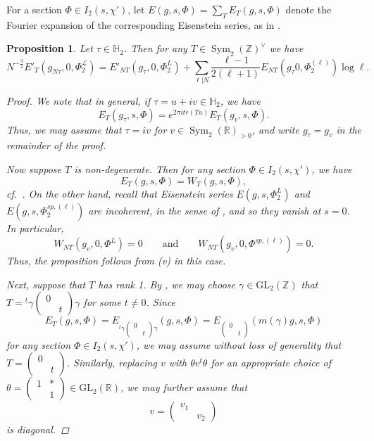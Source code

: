 \documentclass[reqno,oneside]{amsart}
\theoremstyle{plain}
\newtheorem{proposition}[theorem]{Proposition}
\theoremstyle{remark}
\numberwithin{theorem}{section}
\newcommand{\bbR}{\mathbb R}
\newcommand{\bbZ}{\mathbb Z}
\newcommand{\calL}{\mathcal L}
\newcommand{\psm}[1]{\left( \begin{smallmatrix}#1 \end{smallmatrix} \right)}
\DeclareMathOperator{\Sym}{Sym}
\newcommand{\GL}{\mathrm{GL}}
\begin{document}
	For a section $\Phi \in I_{2}(s, \chi')$, let  $E(g, s, \Phi) = \sum_{T} E_T(g, s, \Phi)$ denote the Fourier expansion of the corresponding Eisenstein series, as in .
	
	\begin{proposition} \label{prop5.3}
		Let $\tau \in \mathbb H_2$. Then for any $T \in \Sym_{2}(\bbZ)^{\vee}$ we have
		\begin{equation}
		N^{- \frac32}E'_T(g_{N\tau}, 0, \Phi^{\calL}_2) = E'_{NT}(g_{\tau}, 0, \Phi^{L}_2) + \sum_{\ell|N} \frac{\ell-1}{2(\ell+1)} E_{NT}(g_\tau 0, \Phi^{(\ell)}_2) \log \ell.
		\end{equation}
	
		\begin{proof}
			
			We note that in general, if $\tau = u+iv\in \mathbb H_2$, we have
				\begin{equation}
					E_{T}(g_{\tau},s, \Phi) = e^{2 \pi i tr(Tu)} E_T(g_v, s, \Phi).
				\end{equation}
			Thus, we may assume that $\tau = iv$ for $v \in \Sym_2(\bbR)_{>0}$, and write $g_{\tau} = g_v$ in the remainder of the proof.
			
			
			Now suppose $T$ is non-degenerate. Then for any section $\Phi \in I_2(s, \chi')$, we have
			\begin{equation}
			E_T(g, s, \Phi) = W_T(g, s, \Phi),
			\end{equation}
			cf.\ . On the other hand, recall that Eisenstein series $E(g, s, \Phi^L_2)$ and $E(g, s, \Phi^{sp, (\ell)}_2)$ are incoherent, in the sense of \cite{KudlaCentralDerivs}, and so they vanish at $s=0$. In particular,
			\begin{equation}
			W_{NT}(g_v, 0, \Phi^{L}) = 0  \qquad \text{and} \qquad   	W_{NT}(g_v, 0, \Phi^{sp, (\ell)}) = 0  .
			\end{equation}
			Thus, the proposition follows from (v) in this case.
			
			Next, suppose that $T$ has rank 1. By , we may choose $\gamma \in \GL_2(\bbZ)$ that $T = {}^t \gamma \psm{0 & \\ & t } \gamma$ for some $t \neq 0$.  Since
			\begin{equation}
			E_{T}(g, s, \Phi) = E_{ {}^t \gamma \psm{0 & \\ & t } \gamma}(g, s, \Phi) = E_{ \psm{0&\\ & t}}  (m(\gamma) g, s, \Phi)
			\end{equation}
			for any section $\Phi \in I_2(s, \chi')$, we may assume without loss of generality that $T = \psm{0  & \\ & t}$. Similarly, replacing $v$ with $\theta v {}^t \theta$ for an appropriate choice of $\theta = \psm{1 & * \\ & 1} \in \GL_2(\bbR)$, we may further assume that
			\begin{equation}
			v = \psm{v_1 & \\ & v_2}
			\end{equation}
			is diagonal.
			

\end{proof}
\end{proposition}
\end{document}

